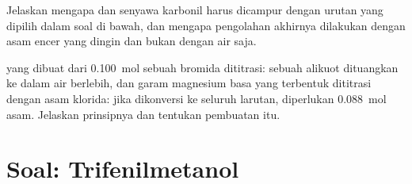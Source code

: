 \begin{exercise}[$\star\star\star$]\label{exo:b1:organomagnesium:11}
Jelaskan mengapa  dan senyawa karbonil harus dicampur
dengan urutan yang dipilih dalam soal di bawah, dan mengapa pengolahan
akhirnya dilakukan dengan asam encer yang dingin dan bukan dengan air
saja.
\end{exercise}

\begin{exercise}[$\star\star\star$]\label{exo:b1:organomagnesium:12}
 yang dibuat dari \qty{0.100}{mol} sebuah bromida
dititrasi: sebuah alikuot dituangkan ke dalam air berlebih, dan garam
magnesium basa yang terbentuk dititrasi dengan asam klorida: jika
dikonversi ke seluruh larutan, diperlukan \qty{0.088}{mol} asam.
Jelaskan prinsipnya dan tentukan  pembuatan itu.
\end{exercise}

\section{Soal: Trifenilmetanol}


